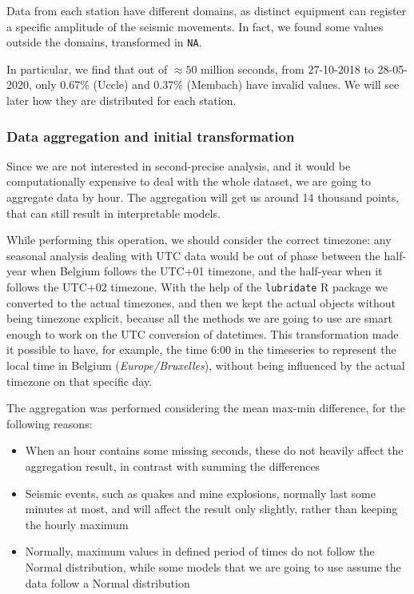 \documentclass[12pt]{article}
\begin{document}
Data from each station have different domains, as distinct equipment can register a specific amplitude of the seismic movements. In fact, we found some values outside the domains, transformed in \texttt{NA}.

In particular, we find that out of $\approx50$ million seconds, from 27-10-2018 to 28-05-2020, only 0.67\% (Uccle) and 0.37\% (Membach) have invalid values. We will see later how they are distributed for each station.



\subsubsection{Data aggregation and initial transformation}
Since we are not interested in second-precise analysis, and it would be computationally expensive to deal with the whole dataset, we are going to aggregate data by hour. The aggregation will get us around 14 thousand points, that can still result in interpretable models.

While performing this operation, we should consider the correct timezone: any seasonal analysis dealing with UTC data would be out of phase between the half-year when Belgium follows the UTC+01 timezone, and the half-year when it follows the UTC+02 timezone. With the help of the \texttt{lubridate} R package we converted to the actual timezones, and then we kept the actual objects without being timezone explicit, because all the methods we are going to use are smart enough to work on the UTC conversion of datetimes. This transformation made it possible to have, for example, the time 6:00 in the timeseries to represent the local time in Belgium (\textit{Europe/Bruxelles}), without being influenced by the actual timezone on that specific day.

The aggregation was performed considering the mean max-min difference, for the following reasons:
\begin{itemize}
	\item When an hour contains some missing seconds, these do not heavily affect the aggregation result, in contrast with summing the differences
	\item Seismic events, such as quakes and mine explosions, normally last some minutes at most, and will affect the result only slightly, rather than keeping the hourly maximum
	\item Normally, maximum values in defined period of times do not follow the Normal distribution, while some models that we are going to use assume the data follow a Normal distribution
\end{itemize}
\end{document}
